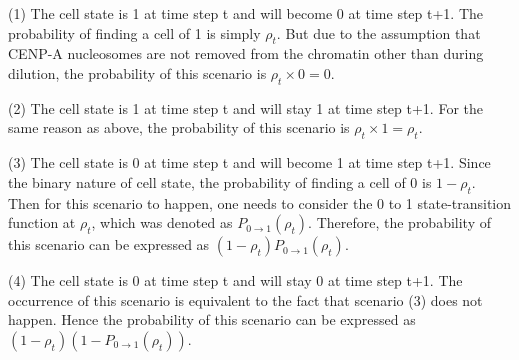 (1) The cell state is 1 at time step t and will become 0 at time step t+1. The probability of finding a cell of 1 is simply $\rho_{t}$. But due to the assumption that CENP-A nucleosomes are not removed from the chromatin other than during dilution, the probability of this scenario is $\rho_{t} \times 0 = 0$. 

(2) The cell state is 1 at time step t and will stay 1 at time step t+1. For the same reason as above, the probability of this scenario is $\rho_{t} \times 1 = \rho_{t}$. 

(3) The cell state is 0 at time step t and will become 1 at time step t+1. Since the binary nature of cell state, the probability of finding a cell of 0 is $1 - \rho_{t}$. Then for this scenario to happen, one needs to consider the 0 to 1 state-transition function at $\rho_{t}$, which was denoted as $P_{0\rightarrow 1}(\rho_{t})$. Therefore, the probability of this scenario can be expressed as $(1 - \rho_{t})P_{0\rightarrow 1}(\rho_{t})$. 

(4) The cell state is 0 at time step t and will stay 0 at time step t+1. The occurrence of this scenario is equivalent to 
the fact that scenario (3) does not happen. Hence the probability of this scenario can be expressed as $(1 - \rho_{t})(1 - P_{0\rightarrow 1}(\rho_{t}))$.


